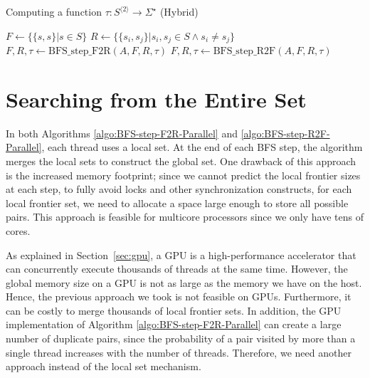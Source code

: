 \begin{algorithm}[ht]
	\label{algo:BFS-Hybrid}
	\caption{Computing a function $\tau : S^{\langle 2 \rangle} \rightarrow \Sigma^\star$ (Hybrid)}
	
	

	
	$F \longleftarrow \{ \{ s,s \} | s \in S \}$\;
	$R \longleftarrow \{ \{ s_i,s_j \} | s_i,s_j \in S \wedge s_i \neq s_j \}$\;
	{
		{
			$F,R,\tau \longleftarrow \mbox{BFS\_step\_F2R}(A,F,R,\tau)$\;
		}
		\Else
		{
			$F,R,\tau \longleftarrow \mbox{BFS\_step\_R2F}(A,F,R,\tau)$\;
		}
	}
\end{algorithm}

\section{Searching from the Entire Set}
\label{sec:BFS-entire-set}
In both Algorithms \ref{algo:BFS-step-F2R-Parallel} and \ref{algo:BFS-step-R2F-Parallel}, each thread uses a local set. At the end of each BFS step, the algorithm merges the local sets to construct the global set. One drawback of this approach is the increased memory footprint; since we cannot predict the local frontier sizes at each step, to fully avoid locks and other synchronization constructs, for each local frontier set, we need to allocate a space large enough to store all possible pairs. This approach is feasible for multicore processors since we only have tens of cores. 

As explained in Section~\ref{sec:gpu}, a GPU is a high-performance accelerator that can concurrently execute thousands of threads at the same time. However, the global memory size on a GPU is not as large as the memory we have on the host. Hence, the previous approach we took is not feasible on GPUs. Furthermore, it can be costly to merge thousands of local frontier sets. In addition, the GPU implementation of Algorithm \ref{algo:BFS-step-F2R-Parallel} can create a large number of duplicate pairs, since the probability of a pair visited by more than a single thread increases with the number of threads. Therefore, we need another approach instead of the local set mechanism. 


